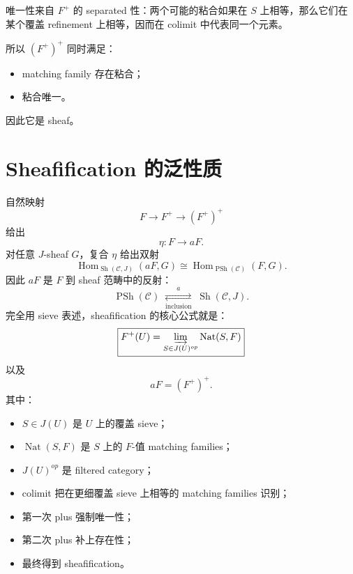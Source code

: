 \documentclass[12pt,a4paper]{article}
\begin{document}
唯一性来自 \(F^+\) 的 separated 性：两个可能的粘合如果在 \(S\) 上相等，那么它们在某个覆盖 refinement 上相等，因而在 colimit 中代表同一个元素。

所以 \((F^+)^+\) 同时满足：
\begin{itemize}
\item matching family 存在粘合；
\item 粘合唯一。
\end{itemize}
因此它是 sheaf。

\section{Sheafification 的泛性质}

自然映射
\[
F\longrightarrow F^+\longrightarrow (F^+)^+
\]
给出
\[
\eta:F\to aF.
\]
对任意 \(J\)-sheaf \(G\)，复合 \(\eta\) 给出双射
\[
\operatorname{Hom}_{\operatorname{Sh}(\mathcal{C},J)}(aF,G)
\cong
\operatorname{Hom}_{\operatorname{PSh}(\mathcal{C})}(F,G).
\]
因此 \(aF\) 是 \(F\) 到 sheaf 范畴中的反射：
\[
\operatorname{PSh}(\mathcal{C})
\;\underset{\text{inclusion}}{\overset{a}{\rightleftarrows}}\;
\operatorname{Sh}(\mathcal{C},J).
\]
完全用 sieve 表述，sheafification 的核心公式就是：
\[
\boxed{
F^+(U)
=
\varinjlim_{S\in J(U)^{op}}
\operatorname{Nat}(S,F)
}
\]
以及
\[
\boxed{
aF=(F^+)^+
}.
\]
其中：
\begin{itemize}
\item \(S\in J(U)\) 是 \(U\) 上的覆盖 sieve；
\item \(\operatorname{Nat}(S,F)\) 是 \(S\) 上的 \(F\)-值 matching families；
\item \(J(U)^{op}\) 是 filtered category；
\item colimit 把在更细覆盖 sieve 上相等的 matching families 识别；
\item 第一次 plus 强制唯一性；
\item 第二次 plus 补上存在性；
\item 最终得到 sheafification。
\end{itemize}
\end{document}
